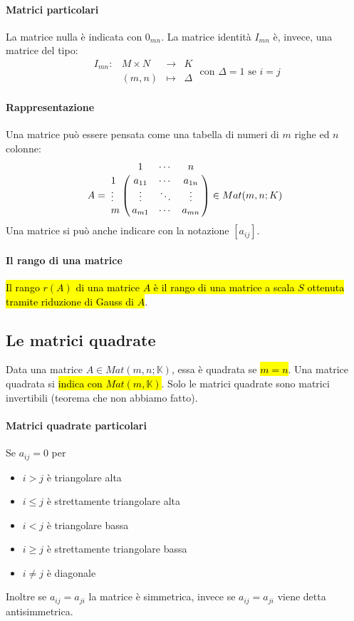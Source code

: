 \documentclass[a4paper,12pt,oneside]{article}
\begin{document}
\paragraph{Matrici particolari} La matrice nulla è indicata con $0_{mn}$. La
matrice identità $I_{mn}$ è, invece, una matrice del tipo:
\[
    \begin{array}{cccc}
        I_{mn}: & M \times N & \to & K \\
        & (m,n) & \mapsto & \Delta
    \end{array} \text{ con } \Delta{} = 1 \text{ se } i = j
\]

\paragraph{Rappresentazione} Una matrice può essere pensata come una tabella di
numeri di $m$ righe ed $n$ colonne:
\[
    A =
    \bordermatrix{~ & 1 & \cdots & n \cr
                  1 & a_{11} & \cdots & a_{1n} \cr
                  \vdots & \vdots & \ddots & \vdots \cr
                  m & a_{m1} & \cdots & a_{mn} \cr }
    \in Mat(m,n;K)
\]
Una matrice si può anche indicare con la notazione $[a_{ij}]$.

\paragraph{Il rango di una matrice} \hl{Il rango $r(A)$ di una matrice $A$ è il
rango di una matrice a scala $S$ ottenuta tramite riduzione di Gauss di $A$}.

\subsection{Le matrici quadrate}
Data una matrice $A \in Mat(m,n;\mathbb{K})$, essa è quadrata se \hl{$m = n$}.
Una matrice quadrata si \hl{indica con $Mat(m,\mathbb{K})$}. Solo le matrici
quadrate sono matrici invertibili (teorema che non abbiamo fatto).

\paragraph{Matrici quadrate particolari} Se $a_{ij} = 0$ per
\begin{itemize}
    \item $i>j$ è triangolare alta
    \item $i \leq j$ è strettamente triangolare alta
    \item $i<j$ è triangolare bassa
    \item $i \geq j$ è strettamente triangolare bassa
    \item $i \neq j$ è diagonale
\end{itemize}
Inoltre se $a_{ij} = a_{ji}$ la matrice è simmetrica, invece se $a_{ij} = a_{ji}$
viene detta antisimmetrica.
\end{document}
